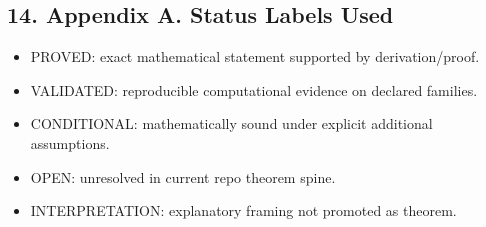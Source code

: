 \documentclass[11pt]{article}
\begin{document}
\subsection*{14. Appendix A. Status Labels Used}
\begin{itemize}
\item PROVED: exact mathematical statement supported by derivation/proof.
\item VALIDATED: reproducible computational evidence on declared families.
\item CONDITIONAL: mathematically sound under explicit additional assumptions.
\item OPEN: unresolved in current repo theorem spine.
\item INTERPRETATION: explanatory framing not promoted as theorem.
\end{itemize}
\end{document}
